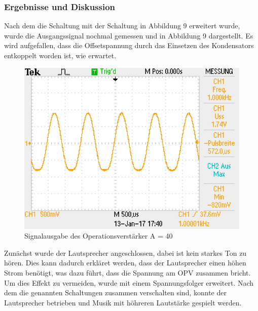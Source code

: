 \subsubsection{Ergebnisse und Diskussion}
Nach dem die Schaltung mit der Schaltung in Abbildung 9 erweitert wurde, wurde die Ausgangssignal nochmal gemessen und in Abbildung 9 dargestellt. Es wird aufgefallen, dass die Offsetspannung durch das Einsetzen des Kondensators entkoppelt worden ist, wie erwartet.
\begin{figure}[!h]
\begin{center}
\includegraphics[scale=0.3]{bild/rc}
\caption{Signalausgabe des Operationsverst\"arker A = 40}
\end{center}
\end{figure}
Zun\"achst wurde der Lautsprecher angeschlossen, dabei ist kein starkes Ton zu h\"oren. Dies kann dadurch erkl\"aret werden, dass  der Lautsprecher einen h\"ohen Strom ben\"otigt, was dazu f\"uhrt, dass die Spannung am OPV zusammen bricht. \\
Um dies Effekt zu vermeiden, wurde mit einem Spannungsfolger erweitert.
Nach dem die genannten Schaltungen zusammen verschalten sind, konnte der Lautsprecher betrieben und Musik mit h\"ohreren Lautst\"arke gespielt werden.
